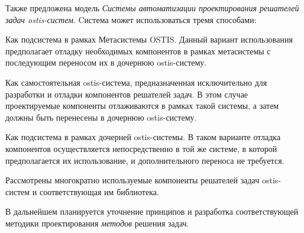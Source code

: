 Также предложена модель \textit{Системы автоматизации проектирования решателей задач ostis-систем}. Cистема может использоваться тремя способами:
\begin{textitemize}
    \item Как подсистема в рамках Метасистемы OSTIS. Данный вариант использования предполагает отладку необходимых компонентов в рамках метасистемы с последующим переносом их в дочернюю ostis-систему.
    \item Как самостоятельная ostis-система, предназначенная исключительно для разработки и отладки компонентов решателей задач. В этом случае проектируемые компоненты отлаживаются в рамках такой системы, а затем должны быть перенесены в дочернюю ostis-систему.
    \item Как подсистема в рамках дочерней ostis-системы. В таком варианте отладка компонентов осуществляется непосредственно в той же системе, в которой предполагается их использование, и дополнительного переноса не требуется.
\end{textitemize}

Рассмотрены многократно используемые компоненты решателей задач ostis-систем и соответствующая им библиотека.

В дальнейшем планируется уточнение принципов и разработка соответствующей методики проектирования \textit{методов} решения задач.

%